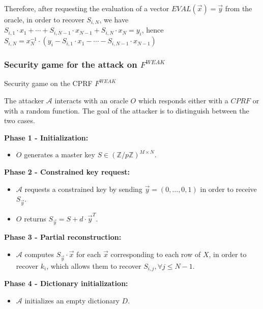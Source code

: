\documentclass[9pt]{extarticle}
\begin{document}
Therefore, after requesting the evaluation of a vector $EVAL(\vec{x}) = \vec{y}$ from the oracle, in order to recover $S_{i,N}$, we have $S_{i,1} \cdot x_1 + \cdots + S_{i,N-1} \cdot x_{N-1} + S_{i,N} \cdot x_N = y_i$, hence
$S_{i,N} = x_N^{-1} \cdot (y_i - S_{i,1} \cdot x_1 - \cdots - S_{i,N-1} \cdot x_{N-1})$

\newpage
\subsubsection{Security game for the attack on $F^{WEAK}$}

\begin{defbox}{Security game on the CPRF $F^{WEAK}$}

  The attacker $\mathcal{A}$ interacts with an oracle $O$ which responds either with a $CPRF$ or with a random function. 
  The goal of the attacker is to distinguish between the two cases.

  \medskip

  \textbf{Phase 1 - Initialization:}
  \begin{itemize}
  \item $O$ generates a master key $S \in (\mathbb{Z}/p\mathbb{Z})^{M \times N}$.
  \end{itemize}

  \medskip

  \textbf{Phase 2 - Constrained key request:}
  \begin{itemize}
  \item $\mathcal{A}$ requests a constrained key by sending $\vec{y} = (0,\ldots,0,1)$ in order to receive $S_{\vec{y}}$.
  \item $O$ returns $S_{\vec{y}} = S + d \cdot \vec{y}^T$.
  \end{itemize}

  \medskip

  \textbf{Phase 3 - Partial reconstruction:}
  \begin{itemize}
  \item $\mathcal{A}$ computes $S_{\vec{y}} \cdot \vec{x}$ for each $\vec{x}$ corresponding to each row of $X$, in order to recover $k_i$, which allows them to recover $S_{i,j}, \forall j \leq N-1$.
  \end{itemize}

  \medskip

  \textbf{Phase 4 - Dictionary initialization:}
  \begin{itemize}
  \item $\mathcal{A}$ initializes an empty dictionary $D$.
  \end{itemize}


\end{defbox}
\end{document}
